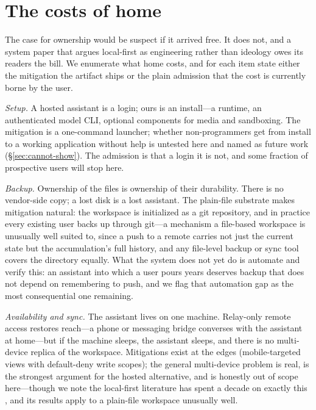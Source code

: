 \documentclass[11pt]{article}
\begin{document}
\section{The costs of home}
\label{sec:costs}

The case for ownership would be suspect if it arrived free. It does not, and a
system paper that argues local-first as engineering rather than ideology owes its
readers the bill. We enumerate what home costs, and for each item state either
the mitigation the artifact ships or the plain admission that the cost is
currently borne by the user.

\emph{Setup.} A hosted assistant is a login; ours is an install---a runtime, an
authenticated model CLI, optional components for media and sandboxing. The
mitigation is a one-command launcher; whether non-programmers get from install to
a working application without help is untested here and named as future work
(\S\ref{sec:cannot-show}). The admission is that a login it is not, and some
fraction of prospective users will stop here.

\emph{Backup.} Ownership of the files is ownership of their durability. There is
no vendor-side copy; a lost disk is a lost assistant. The plain-file substrate
makes mitigation natural: the workspace is initialized as a git repository, and
in practice every existing user backs up through git---a mechanism a file-based
workspace is unusually well suited to, since a push to a remote carries not just
the current state but the accumulation's full history, and any file-level backup
or sync tool covers the directory equally. What the system does not yet do is
automate and verify this: an assistant into which a user pours years deserves
backup that does not depend on remembering to push, and we flag that automation
gap as the most consequential one remaining.

\emph{Availability and sync.} The assistant lives on one machine. Relay-only
remote access restores reach---a phone or messaging bridge converses with the
assistant at home---but if the machine sleeps, the assistant sleeps, and there is
no multi-device replica of the workspace. Mitigations exist at the edges
(mobile-targeted views with default-deny write scopes); the general multi-device
problem is real, is the strongest argument for the hosted alternative, and is
honestly out of scope here---though we note the local-first literature has spent
a decade on exactly this \citep{local-first}, and its results apply to a
plain-file workspace unusually well.
\end{document}

